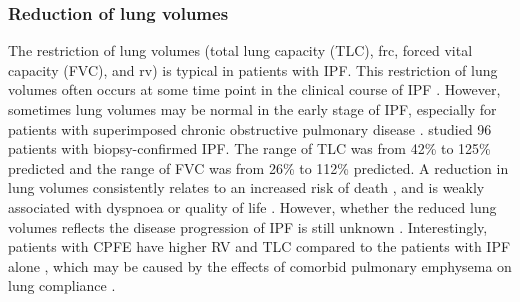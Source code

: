 \subsubsection{Reduction of lung volumes}
The restriction of lung volumes (total lung capacity (TLC), \gls{frc}, forced vital capacity (FVC), and \gls{rv}) is typical in patients with IPF. This restriction of lung volumes often occurs at some time point in the clinical course of IPF \citep{american2000idiopathic, plantier2018physiology}. However, sometimes lung volumes may be normal in the early stage of IPF, especially for patients with superimposed chronic obstructive pulmonary disease \citep{martinez2006pulmonary}. \cite{cherniack1995correlation} studied 96 patients with biopsy-confirmed IPF. The range of TLC was from 42\% to 125\% predicted and the range of FVC was from 26\% to 112\% predicted. A reduction in lung volumes consistently relates to an increased risk of death \citep{martinez2006pulmonary}, and is weakly associated with dyspnoea or quality of life \citep{du2011ascertainment}. However, whether the reduced lung volumes reflects the disease progression of IPF is still unknown \citep{plantier2018physiology}. Interestingly, patients with CPFE have higher RV and TLC compared to the patients with IPF alone \citep{mura2006presence}, which may be caused by the effects of comorbid pulmonary emphysema on lung compliance \citep{doherty1997cryptogenic}.

